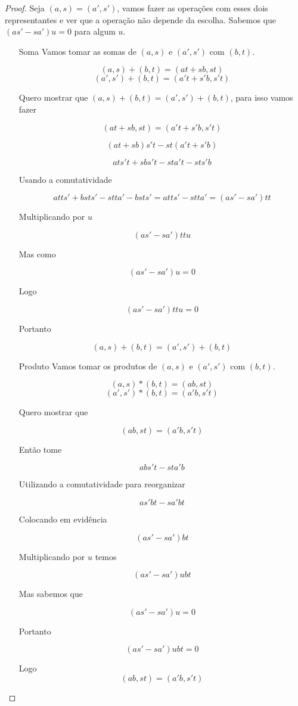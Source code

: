 \documentclass[10pt,a4paper]{article}
\begin{document}
\begin{proof}
	Seja $(a,s)=(a',s')$, vamos fazer as operações com esses dois representantes e ver que a operação não depende da escolha. Sabemos que $(as'-sa')u=0$ para algum $u$.
	
	\begin{enumerate}
		\item[Soma] Vamos tomar as somas de  $(a,s)$ e $(a',s')$ com $(b,t)$.
		
		$$(a,s)+(b,t)=(at+sb,st)$$
		$$(a',s')+(b,t)=(a't+s'b,s't)$$
		
		Quero mostrar que $(a,s)+(b,t)=(a',s')+(b,t)$, para isso vamos fazer 
		
		$$(at+sb,st)=(a't+s'b,s't)$$
		
		$$(at+sb)s't-st(a't+s'b)$$
		
		$$ats't+sbs't-sta't-sts'b$$
		
		Usando a comutatividade 
		
		$$atts'+bsts'-stta'-bsts'=atts'-stta'=(as'-sa')tt$$
		
		Multiplicando por $u$
		
		$$(as'-sa')ttu$$
		
		Mas como 
		
		$$(as'-sa')u=0$$
		
		Logo
		
		$$(as'-sa')ttu=0$$
		
		Portanto 
		
		$$(a,s)+(b,t)=(a',s')+(b,t)$$
		
		\item[Produto] Vamos tomar os produtos de  $(a,s)$ e $(a',s')$ com $(b,t)$.
		
		$$(a,s)*(b,t)=(ab,st)$$
		$$(a',s')*(b,t)=(a'b,s't)$$
		
		Quero mostrar que 
		
		$$(ab,st)=(a'b,s't)$$
		
		Então tome 
		
		$$abs't-sta'b$$
		
		Utilizando a comutatividade para reorganizar
		
		$$as'bt-sa'bt$$
		
		Colocando em evidência
		
		$$(as'-sa')bt$$
		
		Multiplicando por $u$ temos 
		
		$$(as'-sa')ubt$$
		
		Mas sabemos que 
		
		$$(as'-sa')u=0$$
		
		Portanto 
		
		$$(as'-sa')ubt=0$$
		
		Logo $$(ab,st)=(a'b,s't)$$
		
	\end{enumerate}
	
	
	
	
\end{proof}
\end{document}
